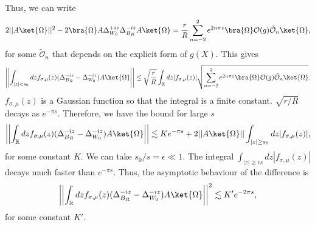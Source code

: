\documentclass[a4paper,11pt]{article}
\theoremstyle{definition}
\theoremstyle{remark}
\begin{document}
Thus, we can write 
\begin{align}
    2||A\ket{\Omega}||^2 - 2\bra{\Omega}A \Delta_{W_0}^{+iz}\Delta_{B_R}^{-iz} A\ket{\Omega} = \frac{r}{R} \sum_{n=-2}^2e^{2n\pi z} \bra{\Omega} \mathcal{O}(g) \tilde{\mathcal{O}}_n\ket{\Omega},
\end{align}
for some $\tilde{\mathcal{O}}_n$ that depends on the explicit form of $g(X)$. This gives 
\begin{align}
    \left|\left|\int_{|z|<s_0} dz f_{\sigma,\mu}(z) (\Delta_{B_R}^{-iz} - \Delta_{W_0}^{-iz})A\ket{\Omega}\right|\right| 
    \leq \sqrt{\frac{r}{R}}\int_{\mathbb{R}} dz |f_{\sigma,\mu}(z)| \sqrt{ \sum_{n=-2}^2e^{2n\pi z} \bra{\Omega} \mathcal{O}(g) \tilde{\mathcal{O}}_n\ket{\Omega}}.
\end{align}
$f_{\sigma,\mu}(z)$ is a Gaussian function so that the integral is a finite constant. $\sqrt{r/R}$ decays as $e^{-\pi s}$. Therefore, we have the bound for large $s$
\begin{align}
    \left|\left|\int_\mathbb{R} dz f_{\sigma,\mu}(z)(\Delta_{B_R}^{-iz} - \Delta_{W_0}^{-iz})A\ket{\Omega}\right|\right| \lesssim  Ke^{-\pi s} + 2||A\ket{\Omega}|| \int_{|z|\geq s_0} dz |f_{\sigma,\mu}(z)|,
\end{align}
for some constant $K$. We can take $s_0/s = \epsilon\ll 1$. The integral $\int_{|z|\geq \epsilon s} dz |f_{\sigma,\mu}(z)|$ decays much faster than $e^{-\pi s}$. Thus, the asymptotic behaviour of the difference is
\begin{align}
    \left|\left|\int_\mathbb{R} dz f_{\sigma,\mu}(z)(\Delta_{B_R}^{-iz} - \Delta_{W_0}^{-iz})A\ket{\Omega}\right|\right|^2 \lesssim  K'e^{-2\pi s},
\end{align}
for some constant $K'$.
\end{document}
